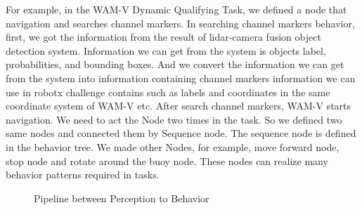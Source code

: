 \documentclass[lettersize,journal]{IEEEtran}
\begin{document}
For example, in the WAM-V Dynamic Qualifying Task, 
we defined a node that navigation and searches channel markers.
In searching channel markers behavior, first, we got the information from the result of lidar-camera fusion object detection system. 
Information we can get from the system is objects label, probabilities, and bounding boxes.
And we convert the information we can get from the system into information containing channel markers information 
we can use in robotx challenge contains such as labels and coordinates in the same coordinate system of WAM-V etc.
After search channel markers, WAM-V starts navigation.
We need to act the Node two times in the task. So we defined two same nodes and connected them by Sequence node. 
The sequence node is defined in the behavior tree.
We made other Nodes, for example, move forward node, stop node and rotate around the buoy node.
These nodes can realize many behavior patterns required in tasks.

\begin{figure}[H]
    \begin{center}
    \end{center}
    \caption{Pipeline between Perception to Behavior}
    \label{fig:behavior_flow}
  \end{figure}
\end{document}
